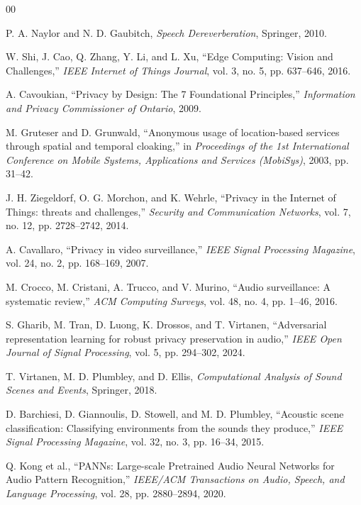 \documentclass[conference]{IEEEtran}
\begin{document}
\begin{thebibliography}{00}

 P. A. Naylor and N. D. Gaubitch, \textit{Speech Dereverberation}, Springer, 2010.

 W. Shi, J. Cao, Q. Zhang, Y. Li, and L. Xu, ``Edge Computing: Vision and Challenges,'' \textit{IEEE Internet of Things Journal}, vol. 3, no. 5, pp. 637--646, 2016.

 A. Cavoukian, ``Privacy by Design: The 7 Foundational Principles,'' \textit{Information and Privacy Commissioner of Ontario}, 2009.

 M. Gruteser and D. Grunwald, ``Anonymous usage of location-based services through spatial and temporal cloaking,'' in \textit{Proceedings of the 1st International Conference on Mobile Systems, Applications and Services (MobiSys)}, 2003, pp. 31--42.

 J. H. Ziegeldorf, O. G. Morchon, and K. Wehrle, ``Privacy in the Internet of Things: threats and challenges,'' \textit{Security and Communication Networks}, vol. 7, no. 12, pp. 2728--2742, 2014.

 A. Cavallaro, ``Privacy in video surveillance,'' \textit{IEEE Signal Processing Magazine}, vol. 24, no. 2, pp. 168--169, 2007.

 M. Crocco, M. Cristani, A. Trucco, and V. Murino, ``Audio surveillance: A systematic review,'' \textit{ACM Computing Surveys}, vol. 48, no. 4, pp. 1--46, 2016.

 S. Gharib, M. Tran, D. Luong, K. Drossos, and T. Virtanen, ``Adversarial representation learning for robust privacy preservation in audio,'' \textit{IEEE Open Journal of Signal Processing}, vol. 5, pp. 294--302, 2024.

 T. Virtanen, M. D. Plumbley, and D. Ellis, \textit{Computational Analysis of Sound Scenes and Events}, Springer, 2018.

 D. Barchiesi, D. Giannoulis, D. Stowell, and M. D. Plumbley, ``Acoustic scene classification: Classifying environments from the sounds they produce,'' \textit{IEEE Signal Processing Magazine}, vol. 32, no. 3, pp. 16--34, 2015.

 Q. Kong et al., ``PANNs: Large-scale Pretrained Audio Neural Networks for Audio Pattern Recognition,'' \textit{IEEE/ACM Transactions on Audio, Speech, and Language Processing}, vol. 28, pp. 2880--2894, 2020.


\end{thebibliography}
\end{document}
